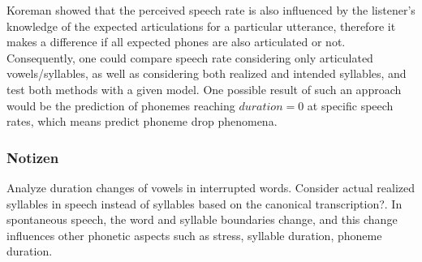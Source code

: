\documentclass[a4paper]{scrreprt}
\begin{document}
Koreman showed \cite{Koreman_2006} that the perceived speech rate is also influenced by the listener's knowledge of the expected articulations for a particular utterance, therefore it makes a difference if all expected phones are also articulated or not. Consequently, one could compare speech rate considering only articulated vowels/syllables, as well as considering both realized and intended syllables, and test both methods with a given model. One possible result of such an approach would be the prediction of phonemes reaching $duration = 0$ at specific speech rates, which means predict phoneme drop phenomena.

\subsubsection*{Notizen}
Analyze duration changes of vowels in interrupted words.
Consider actual realized syllables in speech instead of syllables based on the canonical transcription?. In spontaneous speech, the word and syllable boundaries change, and this change influences other phonetic aspects such as stress, syllable duration, phoneme duration.

\printbibliography
\end{document}
